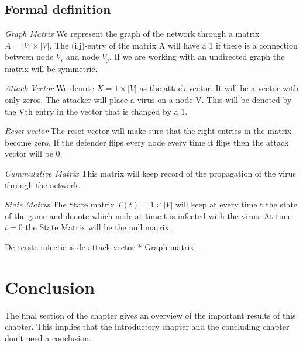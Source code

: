 \begin{description}
\subsection{Formal definition}
\begin{description}
\item \textit{Graph Matrix} We represent the graph of the network through a matrix $ A = |V| \times |V|$. The (i,j)-entry of the matrix A will have a 1 if there is a connection between node $V_{i}$ and node $V_{j}$. If we are working with an undirected graph the matrix will be symmetric. 
\item \textit{Attack Vector} We denote $X = 1 \times |V|$ as the attack vector. It will be a vector with only zeros. The attacker will place a virus on a node V. This will be denoted by the Vth entry in the vector that is changed by a 1.
\item \textit{Reset vector} The reset vector will make sure that the right entries in the matrix become zero. If the defender flips every node every time it flips then the attack vector will be 0.
\item \textit{Cummulative Matrix} This matrix will keep record of the propagation of the virus through the network.
\item \textit{State Matrix} The State matrix $T(t) = 1 \times |V| $ will keep at every time t the state of the game and denote which node at time t is infected with the virus. At time $t=0$ the State Matrix will be the null matrix.
\end{description}
De eerste infectie is de attack vector * Graph matrix . 
\end{description}


\section{Conclusion}
The final section of the chapter gives an overview of the important results
of this chapter. This implies that the introductory chapter and the
concluding chapter don't need a conclusion.



